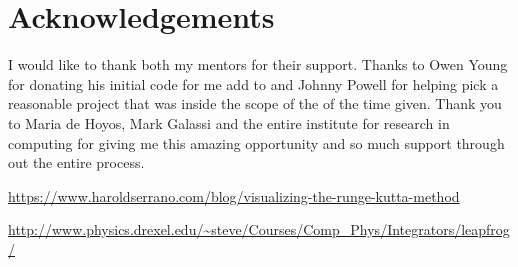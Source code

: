 \documentclass[11pt]{article}
\begin{document}
\section{Acknowledgements}

I would like to thank both my mentors for their support. Thanks to Owen Young for donating his initial code for me add to and Johnny Powell for helping pick a reasonable project that was inside the scope of the of the time given. Thank you to Maria de Hoyos, Mark Galassi and the entire institute for research in computing for giving me this amazing opportunity and so much support through out the entire process. 

\begin{thebibliography}{1}

   
   \url{https://www.haroldserrano.com/blog/visualizing-the-runge-kutta-method}
   
   \url{http://www.physics.drexel.edu/~steve/Courses/Comp_Phys/Integrators/leapfrog/}


  \end{thebibliography}
\end{document}

